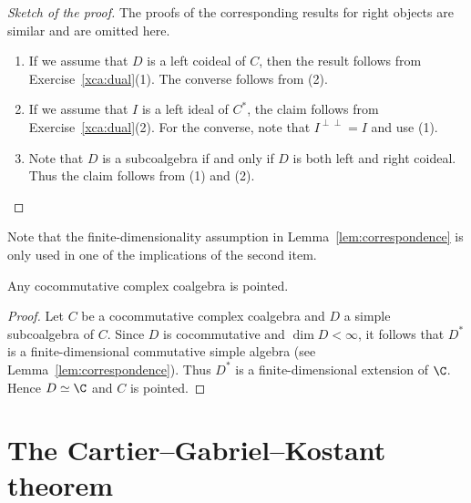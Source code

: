 \documentclass[12pt]{amsproc}
\begin{document}
\begin{proof}[Sketch of the proof]
    The proofs of the corresponding results for right objects are similar and are omitted here.
    \begin{enumerate}
        \item If we assume that $D$ is a left coideal of $C$, then the result 
            follows from Exercise~\ref{xca:dual}(1). The converse follows from (2). 

        \item If we assume that $I$ is a left ideal of $C^*$, the claim 
        follows from Exercise~\ref{xca:dual}(2). For the converse, note
        that $I^{\perp\perp}=I$ and use (1). 
        \item Note that $D$ is a subcoalgebra if and only if 
        $D$ is both left and right coideal. Thus the claim follows from (1) and (2).\qedhere 
    \end{enumerate}
\end{proof}

Note that the finite-dimensionality assumption in Lemma~\ref{lem:correspondence} 
is only used in one of the implications of the second item. 

\begin{theorem}
    Any cocommutative complex coalgebra is pointed.  
\end{theorem}

\begin{proof}
    Let $C$ be a cocommutative complex coalgebra and 
    $D$ a simple subcoalgebra of $C$. Since $D$ is cocommutative and $\dim D<\infty$, it follows that 
    $D^*$ is a finite-dimensional commutative simple algebra (see Lemma~\ref{lem:correspondence}). Thus $D^*$ is a finite-dimensional extension of $\C$. Hence $D\simeq\C$ and 
    $C$ is pointed. 
\end{proof}

\section{The Cartier--Gabriel--Kostant theorem}
\end{document}
